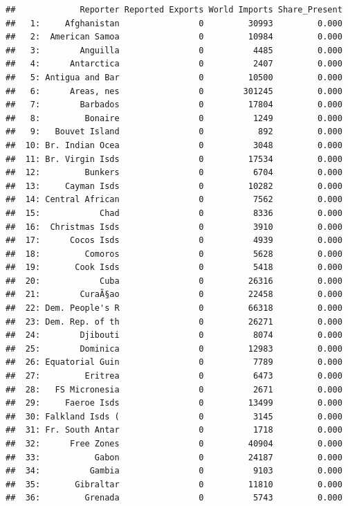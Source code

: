 \documentclass[10pt,]{article}
\begin{document}
\begin{verbatim}
##             Reporter Reported Exports World Imports Share_Present
##   1:     Afghanistan                0         30993         0.000
##   2:  American Samoa                0         10984         0.000
##   3:        Anguilla                0          4485         0.000
##   4:      Antarctica                0          2407         0.000
##   5: Antigua and Bar                0         10500         0.000
##   6:      Areas, nes                0        301245         0.000
##   7:        Barbados                0         17804         0.000
##   8:         Bonaire                0          1249         0.000
##   9:   Bouvet Island                0           892         0.000
##  10: Br. Indian Ocea                0          3048         0.000
##  11: Br. Virgin Isds                0         17534         0.000
##  12:         Bunkers                0          6704         0.000
##  13:     Cayman Isds                0         10282         0.000
##  14: Central African                0          7562         0.000
##  15:            Chad                0          8336         0.000
##  16:  Christmas Isds                0          3910         0.000
##  17:      Cocos Isds                0          4939         0.000
##  18:         Comoros                0          5628         0.000
##  19:       Cook Isds                0          5418         0.000
##  20:            Cuba                0         26316         0.000
##  21:        CuraÃ§ao                0         22458         0.000
##  22: Dem. People's R                0         66318         0.000
##  23: Dem. Rep. of th                0         26271         0.000
##  24:        Djibouti                0          8074         0.000
##  25:        Dominica                0         12983         0.000
##  26: Equatorial Guin                0          7789         0.000
##  27:         Eritrea                0          6473         0.000
##  28:   FS Micronesia                0          2671         0.000
##  29:     Faeroe Isds                0         13499         0.000
##  30: Falkland Isds (                0          3145         0.000
##  31: Fr. South Antar                0          1718         0.000
##  32:      Free Zones                0         40904         0.000
##  33:           Gabon                0         24187         0.000
##  34:          Gambia                0          9103         0.000
##  35:       Gibraltar                0         11810         0.000
##  36:         Grenada                0          5743         0.000

\end{verbatim}
\end{document}
